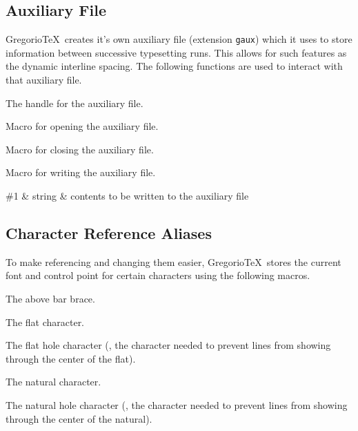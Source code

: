 \subsection{Auxiliary File}
Gregorio\TeX\ creates it's own auxiliary file (extension \texttt{gaux}) which it uses to store information between successive typesetting runs.  This allows for such features as the dynamic interline spacing.  The following functions are used to interact with that auxiliary file.

The handle for the auxiliary file.

Macro for opening the auxiliary file.

Macro for closing the auxiliary file.

Macro for writing the auxiliary file.

\begin{argtable}
  \#1 & string & contents to be written to the auxiliary file\\
\end{argtable}



\subsection{Character Reference Aliases}
To make referencing and changing them easier, Gregorio\TeX\ stores the current font and control point for certain characters using the following macros.

The above bar brace.

The flat character.

The flat hole character (\ie, the character needed to prevent lines from showing through the center of the flat).

The natural character.

The natural hole character (\ie, the character needed to prevent lines from showing through the center of the natural).

